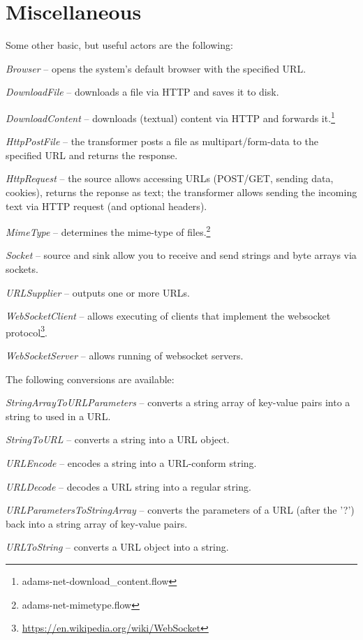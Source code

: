 \documentclass[a4paper]{book}
\begin{document}
\chapter{Miscellaneous}
Some other basic, but useful actors are the following:
\begin{tight_itemize}
	\item \textit{Browser} -- opens the system's default browser with the specified
	URL.
	\item \textit{DownloadFile} -- downloads a file via HTTP and saves it to disk.
	\item \textit{DownloadContent} -- downloads (textual) content via HTTP and 
	forwards it.\footnote{adams-net-download\_content.flow}
	\item \textit{HttpPostFile} -- the transformer posts a file as multipart/form-data
	to the specified URL and returns the response.
	\item \textit{HttpRequest} -- the source allows accessing URLs (POST/GET, sending data,
	cookies), returns the reponse as text; the transformer allows
	sending the incoming text via HTTP request (and optional headers).
	\item \textit{MimeType} -- determines the mime-type of
	files.\footnote{adams-net-mimetype.flow}
	\item \textit{Socket} -- source and sink allow you to receive and send
	strings and byte arrays via sockets.
	\item \textit{URLSupplier} -- outputs one or more URLs.
	\item \textit{WebSocketClient} -- allows executing of clients that implement
	the websocket protocol\footnote{\url{https://en.wikipedia.org/wiki/WebSocket}{}}.
	\item \textit{WebSocketServer} -- allows running of websocket servers.
\end{tight_itemize}
The following conversions are available:
\begin{tight_itemize}
    \item \textit{StringArrayToURLParameters} -- converts a string array of
    key-value pairs into a string to used in a URL.
    \item \textit{StringToURL} -- converts a string into a URL object.
    \item \textit{URLEncode} -- encodes a string into a URL-conform string.
    \item \textit{URLDecode} -- decodes a URL string into a regular string.
    \item \textit{URLParametersToStringArray} -- converts the parameters of
    a URL (after the '?') back into a string array of key-value pairs.
    \item \textit{URLToString} -- converts a URL object into a string.
\end{tight_itemize}
\end{document}
